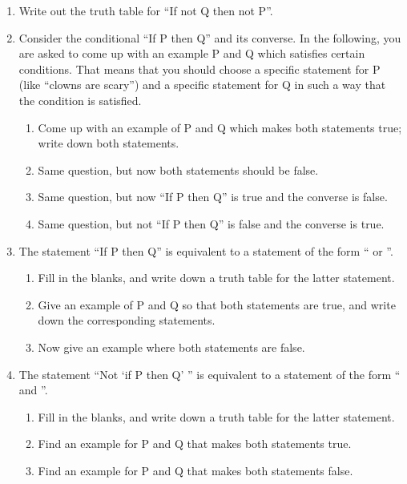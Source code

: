 \probsec{~\ref{sec:negat-logic-equiv}}
\begin{enumerate}
    \item Write out the truth table for ``If not Q then not P''.

    \item Consider the conditional ``If P then Q'' and its converse. In the following, you are asked to come up with an example P and Q which satisfies certain conditions. That means that you should choose a specific statement for P (like ``clowns are scary'') and a specific statement for Q in such a way that the condition is satisfied.
  \begin{enumerate}
      \item Come up with an example of P and Q which makes both statements true; write down both statements.
      \item Same question, but now both statements should be false.
      \item Same question, but now ``If P then Q'' is true and the converse is false.
      \item Same question, but not ``If P then Q'' is false and the converse is true.
  \end{enumerate}

    \item The statement ``If P then Q'' is equivalent to a statement of the form ``\underline{\hspace{.5in}} or \underline{\hspace{.5in}}''.
  \begin{enumerate}
      \item Fill in the blanks, and write down a truth table for the latter statement.
      \item Give an example of P and Q so that both statements are true, and write down the corresponding statements.
      \item Now give an example where both statements are false.
  \end{enumerate}

    \item The statement ``Not `if P then Q' '' is equivalent to a statement of the form ``\underline{\hspace{.5in}} and \underline{\hspace{.5in}}''.
  \begin{enumerate}
      \item  Fill in the blanks, and write down a truth table for the latter statement.
      \item Find an example for P and Q that makes both statements true.
      \item Find an example for P and Q that makes both statements false.
  \end{enumerate}

\end{enumerate}
